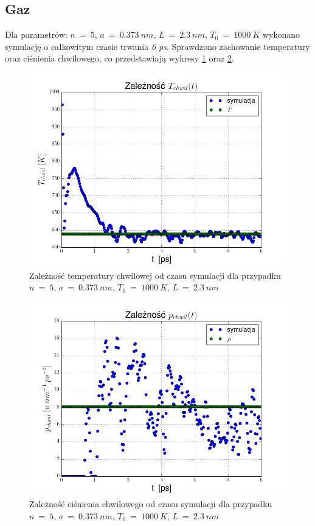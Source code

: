 \documentclass[10]{article}
\begin{document}
\subsection{Gaz}
Dla parametrów: $n~=~5$, $a~=~0.373~ nm$, $L~=~2.3~nm$, $T_0 ~=~1000~ K$ wykonano symulację o całkowitym czasie trwania \textit{6 ps}. Sprawdzono zachowanie temperatury oraz ciśnienia chwilowego, co przedstawiają wykresy \ref{wykres:Tchwil(t)} oraz \ref{wykres:pchwil(t)}. 

\begin{figure}[H]
\begin{center}
\includegraphics[scale=0.6]{T1000_Tchwil.png}
\caption{Zależność temperatury chwilowej od czasu symulacji dla przypadku $n~=~5$, $a~=~0.373~ nm$, $T_0 ~=~1000~ K$, $L~=~2.3~nm$} \label{wykres:Tchwil(t)}
\end{center}
\end{figure}

\begin{figure}[H]
\begin{center}
\includegraphics[scale=0.5]{T1000_pchwil.png}
\caption{Zależność ciśnienia chwilowego od czasu symulacji dla przypadku $n~=~5$, $a~=~0.373~ nm$, $T_0 ~=~1000~ K$, $L~=~2.3~nm$} \label{wykres:pchwil(t)}\end{center}
\end{figure}
\end{document}
